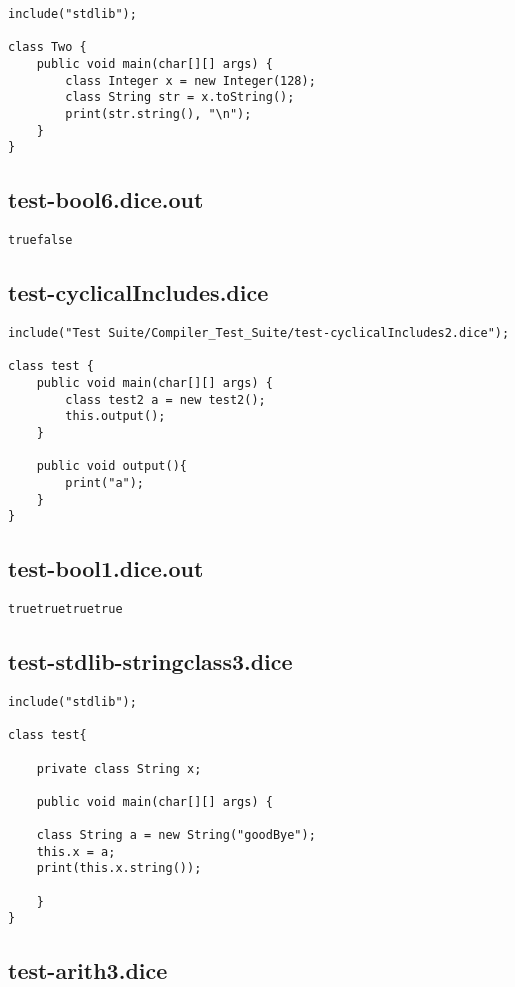 \begin{verbatim}
include("stdlib");

class Two {
	public void main(char[][] args) {
        class Integer x = new Integer(128);
        class String str = x.toString();
        print(str.string(), "\n");
	}
}

\end{verbatim}\pagebreak\subsection{test-bool6.dice.out}
\begin{verbatim}
truefalse
\end{verbatim}\pagebreak\subsection{test-cyclicalIncludes.dice}
\begin{verbatim}
include("Test Suite/Compiler_Test_Suite/test-cyclicalIncludes2.dice");

class test {
	public void main(char[][] args) {
        class test2 a = new test2();
        this.output();
	}

	public void output(){
		print("a");
	}
}

\end{verbatim}\pagebreak\subsection{test-bool1.dice.out}
\begin{verbatim}
truetruetruetrue
\end{verbatim}\pagebreak\subsection{test-stdlib-stringclass3.dice}
\begin{verbatim}
include("stdlib");

class test{
	
	private class String x;

	public void main(char[][] args) {

	class String a = new String("goodBye");
	this.x = a;
	print(this.x.string());
	
	}
}
\end{verbatim}\pagebreak\subsection{test-arith3.dice}
